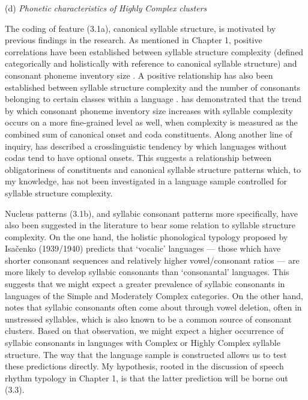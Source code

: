 (d)   \textit{Phonetic} \textit{characteristics} \textit{of} \textit{Highly} \textit{Complex} \textit{clusters}

\z


  The coding of feature (3.1a), canonical syllable structure, is motivated by previous findings in the research. As mentioned in Chapter 1, positive correlations have been established between syllable structure complexity (defined categorically and holistically with reference to canonical syllable structure) and consonant phoneme inventory size \citep{Maddieson2013a}. A positive relationship has also been established between syllable structure complexity and the number of consonants belonging to certain classes within a language \citep{MaddiesonEtAl2013}. \citet{Gordon2016} has demonstrated that the trend by which consonant phoneme inventory size increases with syllable complexity occurs on a more fine-grained level as well, when complexity is measured as the combined sum of canonical onset and coda constituents. Along another line of inquiry, \citet[336]{Blevins2006} has described a crosslinguistic tendency by which languages without codas tend to have optional onsets. This suggests a relationship between obligatoriness of constituents and canonical syllable structure patterns which, to my knowledge, has not been investigated in a language sample controlled for syllable structure complexity.



  Nucleus patterns (3.1b), and syllabic consonant patterns more specifically, have also been suggested in the literature to bear some relation to syllable structure complexity. On the one hand, the holistic phonological typology proposed by Isačenko (1939/1940) predicts that ‘vocalic’ languages — those which have shorter consonant sequences and relatively higher vowel/consonant ratios — are more likely to develop syllabic consonants than ‘consonantal’ languages. This suggests that we might expect a greater prevalence of syllabic consonants in languages of the Simple and Moderately Complex categories. On the other hand, \citet{Bell1978a} notes that syllabic consonants often come about through vowel deletion, often in unstressed syllables, which is also known to be a common source of consonant clusters. Based on that observation, we might expect a higher occurrence of syllabic consonants in languages with Complex or Highly Complex syllable structure. The way that the language sample is constructed allows us to test these predictions directly. My hypothesis, rooted in the discussion of speech rhythm typology in Chapter 1, is that the latter prediction will be borne out (3.3).



